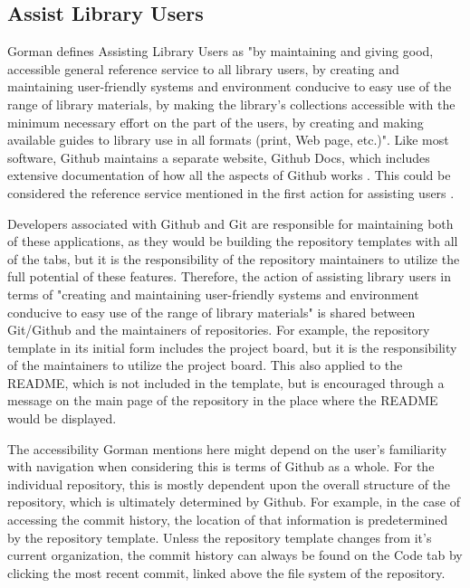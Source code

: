 \subsection{Assist Library Users}
Gorman defines Assisting Library Users as "by maintaining and giving good, accessible general reference service to all library users, by creating and maintaining user-friendly systems and environment conducive to easy use of the range of library materials, by making the library's collections accessible with the minimum necessary effort on the part of the users, by creating and making available guides to library use in all formats (print, Web page, etc.)"\cite{gorman2000values}. Like most software, Github maintains a separate website, Github Docs, which includes extensive documentation of how all the aspects of Github works \cite{githubdocs}. This could be considered the reference service mentioned in the first action for assisting users \cite{gorman2000values}.

Developers associated with Github and Git are responsible for maintaining both of these applications, as they would be building the repository templates with all of the tabs, but it is the responsibility of the repository maintainers to utilize the full potential of these features. Therefore, the action of assisting library users in terms of "creating and maintaining user-friendly systems and environment conducive to easy use of the range of library materials"\cite{gorman2000values} is shared between Git/Github and the maintainers of repositories. For example, the repository template in its initial form includes the project board, but it is the responsibility of the maintainers to utilize the project board. This also applied to the README, which is not included in the template, but is encouraged through a message on the main page of the repository in the place where the README would be displayed. 

The accessibility Gorman mentions here might depend on the user's familiarity with navigation when considering this is terms of Github as a whole. For the individual repository, this is mostly dependent upon the overall structure of the repository, which is ultimately determined by Github. For example, in the case of accessing the commit history, the location of that information is predetermined by the repository template. Unless the repository template changes from it's current organization, the commit history can always be found on the Code tab by clicking the most recent commit, linked above the file system of the repository. 

